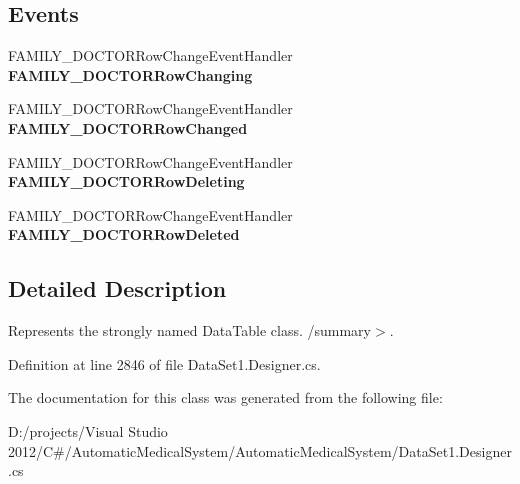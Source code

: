 \subsection*{Events}
\begin{CompactItemize}
\item 
FAMILY\_\-DOCTORRowChangeEventHandler \textbf{FAMILY\_\-DOCTORRowChanging}\label{class_automatic_medical_system_1_1_data_set1_1_1_f_a_m_i_l_y___d_o_c_t_o_r_data_table_844fcf3c0abd56812581b822e422b22e}

\item 
FAMILY\_\-DOCTORRowChangeEventHandler \textbf{FAMILY\_\-DOCTORRowChanged}\label{class_automatic_medical_system_1_1_data_set1_1_1_f_a_m_i_l_y___d_o_c_t_o_r_data_table_8be92a1622fcb67f84491cac197a0b0c}

\item 
FAMILY\_\-DOCTORRowChangeEventHandler \textbf{FAMILY\_\-DOCTORRowDeleting}\label{class_automatic_medical_system_1_1_data_set1_1_1_f_a_m_i_l_y___d_o_c_t_o_r_data_table_c31768d1e51777c6930cd897d7ff92a6}

\item 
FAMILY\_\-DOCTORRowChangeEventHandler \textbf{FAMILY\_\-DOCTORRowDeleted}\label{class_automatic_medical_system_1_1_data_set1_1_1_f_a_m_i_l_y___d_o_c_t_o_r_data_table_a49a2e0234fdcd3562ec175dc9b7522f}

\end{CompactItemize}


\subsection{Detailed Description}
Represents the strongly named DataTable class. /summary$>$. 

Definition at line 2846 of file DataSet1.Designer.cs.

The documentation for this class was generated from the following file:\begin{CompactItemize}
\item 
D:/projects/Visual Studio 2012/C\#/AutomaticMedicalSystem/AutomaticMedicalSystem/DataSet1.Designer.cs\end{CompactItemize}
